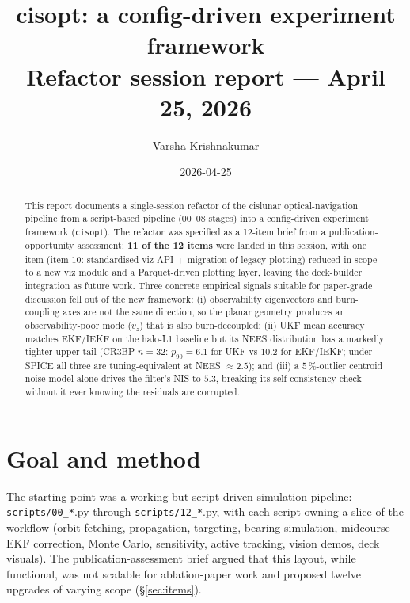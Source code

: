 \documentclass[11pt]{article}
\title{\textbf{cisopt}: a config-driven experiment framework\\[2pt]
       \large{Refactor session report --- April 25, 2026}}
\author{Varsha Krishnakumar}
\date{2026-04-25}
\begin{document}
\maketitle

\begin{abstract}
\noindent
This report documents a single-session refactor of the cislunar
optical-navigation pipeline from a script-based pipeline (00--08 stages) into
a config-driven experiment framework (\texttt{cisopt}). The refactor was
specified as a 12-item brief from a publication-opportunity assessment;
\textbf{11 of the 12 items} were landed in this session, with one item
(item 10: standardised viz API + migration of legacy plotting) reduced in
scope to a new viz module and a Parquet-driven plotting layer, leaving the
deck-builder integration as future work. Three concrete empirical signals
suitable for paper-grade discussion fell out of the new framework:
(i) observability eigenvectors and burn-coupling axes are not the same
direction, so the planar geometry produces an observability-poor mode
($v_z$) that is also burn-decoupled; (ii) UKF mean accuracy matches
EKF/IEKF on the halo-L1 baseline but its NEES distribution has a markedly
tighter upper tail (CR3BP $n=32$: $p_{90}=6.1$ for UKF vs $10.2$ for
EKF/IEKF; under SPICE all three are tuning-equivalent at NEES $\approx 2.5$);
and (iii) a $5\,\%$-outlier centroid noise model alone drives the filter's
NIS to $5.3$, breaking its self-consistency check without it ever knowing
the residuals are corrupted.
\end{abstract}

\tableofcontents
\vspace{1em}

\section{Goal and method}

The starting point was a working but script-driven simulation pipeline:
\texttt{scripts/00\_*}.py through \texttt{scripts/12\_*}.py, with each
script owning a slice of the workflow (orbit fetching, propagation,
targeting, bearing simulation, midcourse EKF correction, Monte Carlo,
sensitivity, active tracking, vision demos, deck visuals). The
publication-assessment brief argued that this layout, while functional, was
not scalable for ablation-paper work and proposed twelve upgrades of
varying scope (\S\ref{sec:items}).
\end{document}
